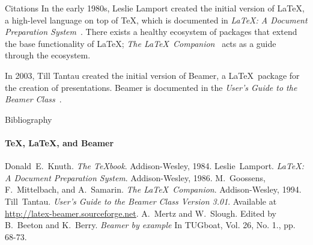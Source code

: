 \documentclass{beamer}
\begin{document}
\begin{darkframes}
\begin{frame}[label=citations]{Citations}
    In the early 1980s, Leslie Lamport created the initial version
    of \LaTeX, a high-level language on top of \TeX, which is
    documented in \emph{\LaTeX : A Document Preparation
      System}~\cite{lamport94}. There exists a healthy ecosystem of
    packages that extend the base functionality of \LaTeX;
    \emph{The \LaTeX\ Companion}~\cite{MG94} acts as a guide
    through the ecosystem.

    In 2003, Till Tantau created the initial version of Beamer, a
    \LaTeX\ package for the creation of presentations. Beamer is
    documented in the \emph{User's Guide to the Beamer
      Class}~\cite{tantau04}.
  \end{frame}

  \begin{frame}[label=bibliography]{Bibliography}
    \framesubtitle{\TeX, \LaTeX, and Beamer}
    \begin{thebibliography}{9}
      Donald~E.~Knuth.
      \emph{The \TeX book}.
      Addison-Wesley, 1984.
      Leslie~Lamport.
      \emph{\LaTeX : A Document Preparation System}.
      Addison-Wesley, 1986.
      M.~Goossens, F.~Mittelbach, and A.~Samarin.
      \emph{The \LaTeX\ Companion}.
      Addison-Wesley, 1994.
      Till~Tantau.
      \emph{User's Guide to the Beamer Class Version 3.01}.
      Available at \url{http://latex-beamer.sourceforge.net}.
      A.~Mertz and W.~Slough.
      Edited by B.~Beeton and K.~Berry.
      \emph{Beamer by example} In TUGboat,
      Vol. 26, No. 1., pp. 68-73.
    \end{thebibliography}
  \end{frame}
\end{darkframes}
\end{document}
